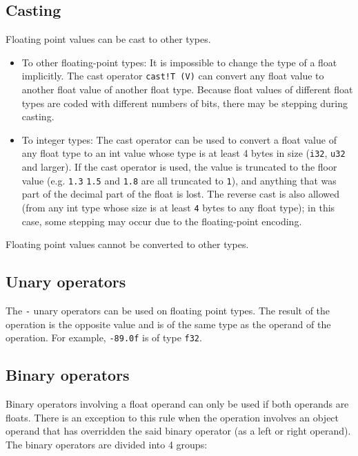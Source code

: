 \subsection{Casting}
\label{sec:org9eacb07}

Floating point values can be cast to other types.

\begin{itemize}
\item To other floating-point types: It is impossible to change the type of a
  float implicitly. The cast operator \texttt{cast!T (V)} can convert any float
  value to another float value of another float type. Because float values of
  different float types are coded with different numbers of bits, there may be
  stepping during casting.

\item To integer types: The cast operator can be used to convert a float value
  of any float type to an int value whose type is at least 4 bytes in size
  (\texttt{i32}, \texttt{u32} and larger). If the cast operator is used, the
  value is truncated to the floor value (e.g. \texttt{1.3} \texttt{1.5} and
  \texttt{1.8} are all truncated to \texttt{1}), and anything that was part of
  the decimal part of the float is lost. The reverse cast is also allowed (from
  any int type whose size is at least \texttt{4} bytes to any float type); in
  this case, some stepping may occur due to the floating-point encoding.

\end{itemize}

Floating point values cannot be converted to other types.

\subsection{Unary operators}
\label{sec:org30770bf}

The \texttt{-} unary operators can be used on floating point types. The result
of the operation is the opposite value and is of the same type as the operand of
the operation. For example, \texttt{-89.0f} is of type \texttt{f32}.

\subsection{Binary operators}
\label{sec:orga43d13a}

Binary operators involving a float operand can only be used if both operands are
floats. There is an exception to this rule when the operation involves an object
operand that has overridden the said binary operator (as a left or right
operand). The binary operators are divided into 4 groups:

